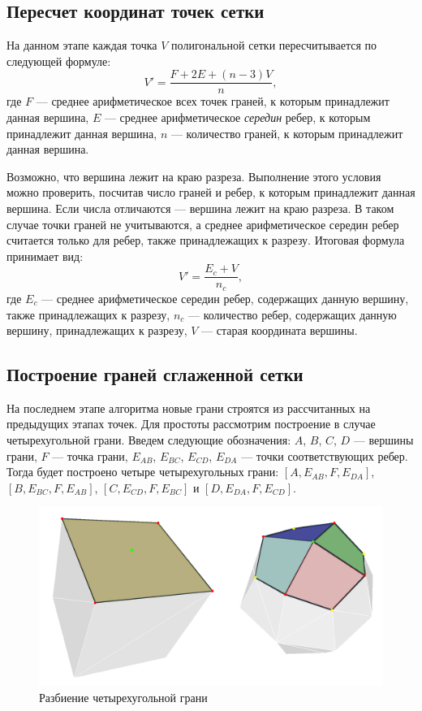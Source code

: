 \documentclass[14pt]{extarticle}
\begin{document}
\subsection{Пересчет координат точек сетки}
На данном этапе каждая точка $V$ полигональной сетки пересчитывается по следующей формуле:  
\begin{equation}\label{eq:v1}
  V' = \frac{F + 2E + (n - 3)V}{n},
\end{equation}
где $F$ --- среднее арифметическое всех точек граней, к которым принадлежит данная вершина, $E$ --- среднее арифметическое \emph{середин} ребер, к которым принадлежит данная вершина, $n$ --- количество граней, к которым принадлежит данная вершина. 

Возможно, что вершина лежит на краю разреза. Выполнение этого условия можно проверить, посчитав число граней и ребер, к которым принадлежит данная вершина. Если числа отличаются --- вершина лежит на краю разреза. В таком случае точки граней не учитываются, а среднее арифметическое середин ребер считается только для ребер, также принадлежащих к разрезу. Итоговая формула принимает вид:
\begin{equation}\label{eq:v2}
  V' = \frac{E_c + V}{n_c},
\end{equation}
где $E_c$ --- среднее арифметическое середин ребер, содержащих данную вершину, также принадлежащих к разрезу, $n_c$ --- количество ребер, содержащих данную вершину, принадлежащих к разрезу, $V$ --- старая координата вершины.

\subsection{Построение граней сглаженной сетки}
На последнем этапе алгоритма новые грани строятся из рассчитанных на предыдущих этапах точек. Для простоты рассмотрим построение в случае четырехугольной грани. Введем следующие обозначения: $A$, $B$, $C$, $D$ --- вершины грани, $F$ --- точка грани, $E_{AB}$, $E_{BC}$, $E_{CD}$, $E_{DA}$ --- точки соответствующих ребер. Тогда будет построено четыре четырехугольных грани: $[A, E_{AB}, F, E_{DA}]$, $[B, E_{BC}, F, E_{AB}]$, $[C, E_{CD}, F, E_{BC}]$ и $[D, E_{DA}, F, E_{CD}]$.

\begin{figure}[H]
  \centering
    \includegraphics[scale=0.25]{subdiv.png}
    \caption{Разбиение четырехугольной грани}
\end{figure}
\end{document}
